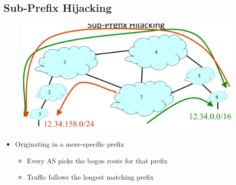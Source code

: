 \subsection{Sub-Prefix Hijacking}
\begin{figure}[H]
    \includegraphics[scale=0.5]{lazy/subprefixhijacking.png}
\end{figure}
\begin{itemize}[nosep]
    \item Originating in a more-specific prefix
          \begin{itemize}[nosep]
              \item Every AS picks the bogus route for that prefix
              \item Traffic follows the longest matching prefix
          \end{itemize}
\end{itemize}

